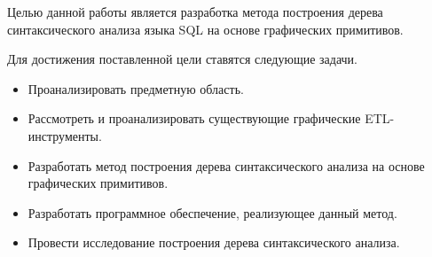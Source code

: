 \Introduction



Целью данной работы является разработка метода построения дерева синтаксического
анализа языка SQL на основе графических примитивов.

Для достижения поставленной цели ставятся следующие задачи.

\begin{itemize}
	\item Проанализировать предметную область.
	\item Рассмотреть и проанализировать существующие графические ETL-инструменты.
	\item Разработать метод построения дерева синтаксического анализа на основе графических примитивов.
	\item Разработать программное обеспечение, реализующее данный метод.
	\item Провести исследование построения дерева синтаксического анализа.
\end{itemize}